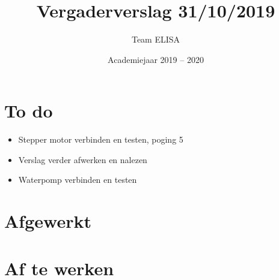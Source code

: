 \documentclass[a4paper,kulak]{kulakarticle} %
\date{Academiejaar 2019 -- 2020}
\title{Vergaderverslag 31/10/2019}
\author{Team ELISA}
\begin{document}
	
	\maketitle
	
	\section*{To do}
	
	\begin{itemize}
		\item Stepper motor verbinden en testen, poging 5
		\item Verslag verder afwerken en nalezen
		\item Waterpomp verbinden en testen
		
	\end{itemize}
	
	\section*{Afgewerkt}
	
	
	\section*{Af te werken}
	
	
\end{document}
